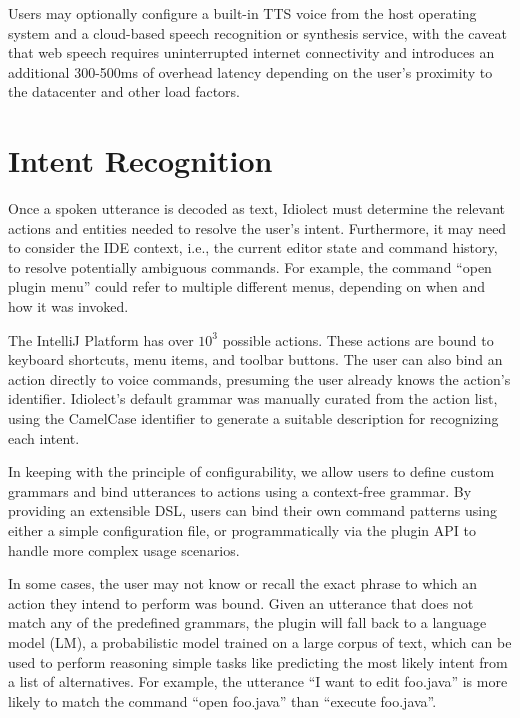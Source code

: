\documentclass[conference]{IEEEtran}
\begin{document}

Users may optionally configure a built-in TTS voice from the host operating system and a cloud-based speech recognition or synthesis service, with the caveat that web speech requires uninterrupted internet connectivity and introduces an additional 300-500ms of overhead latency depending on the user's proximity to the datacenter and other load factors.

\section{Intent Recognition}

Once a spoken utterance is decoded as text, Idiolect must determine the relevant actions and entities needed to resolve the user's intent. Furthermore, it may need to consider the IDE context, i.e., the current editor state and command history, to resolve potentially ambiguous commands. For example, the command ``open plugin menu'' could refer to multiple different menus, depending on when and how it was invoked.

The IntelliJ Platform has over $10^3$ possible actions. These actions are bound to keyboard shortcuts, menu items, and toolbar buttons. The user can also bind an action directly to voice commands, presuming the user already knows the action's identifier. Idiolect's default grammar was manually curated from the action list, using the CamelCase identifier to generate a suitable description for recognizing each intent.

In keeping with the principle of configurability, we allow users to define custom grammars and bind utterances to actions using a context-free grammar. By providing an extensible DSL, users can bind their own command patterns using either a simple configuration file, or programmatically via the plugin API to handle more complex usage scenarios.

In some cases, the user may not know or recall the exact phrase to which an action they intend to perform was bound. Given an utterance that does not match any of the predefined grammars, the plugin will fall back to a language model (LM), a probabilistic model trained on a large corpus of text, which can be used to perform reasoning simple tasks like predicting the most likely intent from a list of alternatives. For example, the utterance ``I want to edit foo.java'' is more likely to match the command ``open foo.java'' than ``execute foo.java''.
\end{document}
